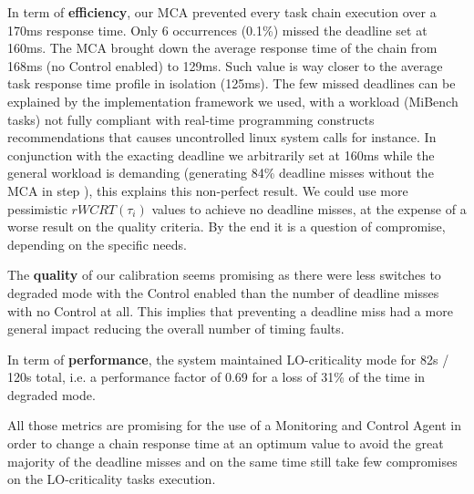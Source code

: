 \documentclass[french, a4paper, 11pt, twoside, pdftex]{StyleThese}
\begin{document}
                    In term of \textbf{efficiency}, our MCA prevented every task chain execution over a 170ms response time. Only 6 occurrences (0.1\%) missed the deadline set at 160ms.  The MCA brought down the average response time of the chain from 168ms (no Control enabled) to 129ms. Such value is way closer to the average task response time profile in isolation (125ms). The few missed deadlines can be explained by the implementation framework we used, with a workload (MiBench tasks) not fully compliant with real-time programming constructs recommendations that causes uncontrolled linux system calls for instance. In conjunction with the exacting deadline we arbitrarily set at 160ms while the general workload is demanding (generating 84\% deadline misses without the MCA in step \circleTxt[3]), this explains this non-perfect result. We could use more pessimistic $rWCRT(\tau_i)$ values to achieve no deadline misses, at the expense of a worse result on the quality criteria. By the end it is a question of compromise, depending on the specific needs.
                 
                    The \textbf{quality} of our calibration seems promising as there were less switches to degraded mode with the Control enabled than the number of deadline misses with no Control at all. This implies that preventing a deadline miss had a more general impact reducing the overall number of timing faults.
                 
                    In term of \textbf{performance}, the system maintained LO-criticality mode for 82s / 120s total, i.e. a performance factor of 0.69 for a loss of 31\% of the time in degraded mode.
                 
                    All those metrics are promising for the use of a Monitoring and Control Agent in order to change a chain response time at an optimum value to avoid the great majority of the deadline misses and on the same time still take few compromises on the LO-criticality tasks execution.
            
\end{document}
